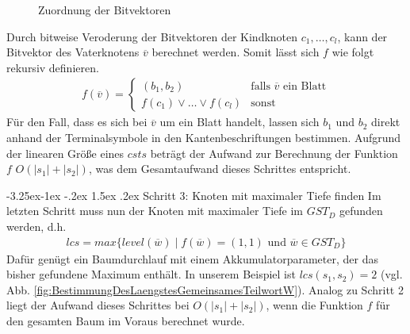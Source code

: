 \documentclass[12pt]{report}
\makeatletter
\renewcommand\paragraph{\@startsection{paragraph}{4}{\z@}%
    {-3.25ex\@plus -1ex \@minus -.2ex}%
    {1.5ex \@plus .2ex}%
    {\normalfont\normalsize\bfseries}}
\newcommand{\abs}[1]{\left|#1\right|}
\makeatother
\begin{document}
\begin{figure}[b]
\caption{Zuordnung der Bitvektoren}
\label{ZuordnungDerBitvektoren}
\end{figure}
Durch bitweise Veroderung der Bitvektoren der Kindknoten $c_1, \dots, c_l$, kann der Bitvektor des Vaterknotens $\overline{v}$ berechnet werden. Somit lässt sich $f$ wie folgt rekursiv definieren.
\begin{gather*}
    f(\overline{v}) = \begin{cases}
        (b_1, b_2)                    &\text{falls } \overline{v} \text{ ein Blatt} \\
        f(c_1) \vee \dots \vee f(c_l) &\text{sonst}
    \end{cases}
\end{gather*}
Für den Fall, dass es sich bei $\overline{v}$ um ein Blatt handelt, lassen sich $b_1$ und $b_2$ direkt anhand der Terminalsymbole in den Kantenbeschriftungen bestimmen. Aufgrund der linearen Größe eines $csts$ beträgt der Aufwand zur Berechnung der Funktion $f$ $O(\abs{s_1} + \abs{s_2})$, was dem Gesamtaufwand dieses Schrittes entspricht.

\paragraph{Schritt 3: Knoten mit maximaler Tiefe finden}
Im letzten Schritt muss nun der Knoten mit maximaler Tiefe im $GST_D$ gefunden werden, d.h.
\begin{gather*}
   lcs = max \{level(\overline{w}) \mid f(\overline{w}) = (1, 1) \text{ und } \overline{w} \in GST_D\}
\end{gather*}
Dafür genügt ein Baumdurchlauf mit einem Akkumulatorparameter, der das bisher gefundene Maximum enthält. In unserem Beispiel ist $lcs(s_1, s_2) = 2$ (vgl. Abb. \ref{fig:BestimmungDesLaengstesGemeinsamesTeilwortW}). Analog zu Schritt 2 liegt der Aufwand dieses Schrittes bei $O(\abs{s_1} + \abs{s_2})$, wenn die Funktion $f$ für den gesamten Baum im Voraus berechnet wurde.
\end{document}
